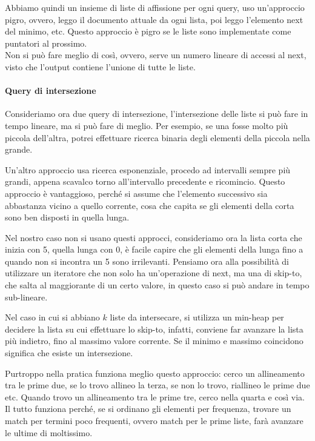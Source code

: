 Abbiamo quindi un insieme di liste di affissione per ogni query, 
uso un'approccio pigro, ovvero, leggo il documento attuale da ogni lista, 
poi leggo l'elemento next del minimo, etc.
Questo approccio è pigro se le liste sono implementate come puntatori al prossimo.\\
Non si può fare meglio di così, ovvero, serve un numero lineare di accessi 
al next, visto che l'output contiene l'unione di tutte le liste.

\paragraph{Query di intersezione}
Consideriamo ora due query di intersezione, l'intersezione delle liste si può 
fare in tempo lineare, ma si può fare di meglio. Per esempio, 
se una fosse molto più piccola dell'altra, potrei effettuare ricerca binaria 
degli elementi della piccola nella grande.

Un'altro approccio usa ricerca esponenziale, procedo ad intervalli sempre più grandi,
appena scavalco torno all'intervallo precedente e ricomincio.
Questo approccio è vantaggioso, perché si assume che l'elemento successivo sia 
abbastanza vicino a quello corrente, cosa che capita se gli elementi della corta 
sono ben disposti in quella lunga.

Nel nostro caso non si usano questi approcci, consideriamo ora la lista corta 
che inizia con 5, quella lunga con 0, è facile capire che gli elementi della lunga
fino a quando non si incontra un 5 sono irrilevanti. Pensiamo ora alla possibilità 
di utilizzare un iteratore che non solo ha un'operazione di next, ma una di 
skip-to, che salta al maggiorante di un certo valore, in questo caso si può 
andare in tempo sub-lineare.

Nel caso in cui si abbiano $k$ liste da intersecare, si utilizza un min-heap 
per decidere la lista su cui effettuare lo skip-to, infatti, conviene far avanzare la lista più indietro, fino al massimo valore corrente. 
Se il minimo e massimo coincidono significa che esiste un intersezione.

Purtroppo nella pratica funziona meglio questo approccio: 
cerco un allineamento tra le prime due, se lo trovo allineo la terza, se non lo trovo, riallineo le prime due etc.
Quando trovo un allineamento tra le prime tre, cerco nella quarta e così via.
Il tutto funziona perché, se si ordinano gli elementi per frequenza, trovare un 
match per termini poco frequenti, ovvero match per le prime liste, farà avanzare 
le ultime di moltissimo.

